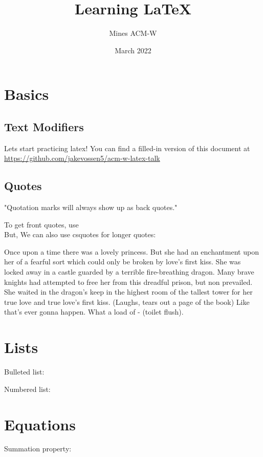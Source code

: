 \documentclass{article}
\begin{document}
\title{Learning \LaTeX}
\author{Mines ACM-W}
\date{March 2022}

\maketitle
\tableofcontents
\newpage

\section{Basics}
\subsection{Text Modifiers}
Lets start practicing latex! You can find a filled-in version of this document at \url{https://github.com/jakevossen5/acm-w-latex-talk}

\subsection{Quotes}
"Quotation marks will always show up as back quotes."

To get front quotes, use \`\` \\

But,  We can also use csquotes for longer quotes:
\begin{displayquote}
Once upon a time there was a lovely princess. But she had an enchantment upon her of a fearful sort which could only be broken by love's first kiss. She was locked away in a castle guarded by a terrible fire-breathing dragon. Many brave knights had attempted to free her from this dreadful prison, but non prevailed. She waited in the dragon's keep in the highest room of the tallest tower for her true love and true love's first kiss. (Laughs, tears out a page of the book) Like that's ever gonna happen. What a load of - (toilet flush).
\end{displayquote}


\section{Lists}
Bulleted list:

Numbered list:


\section{Equations}
Summation property: \\
\end{document}
